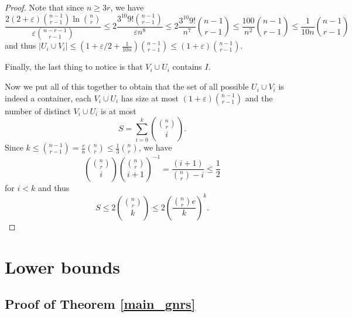 \documentclass[10pt,a4paper]{article}
\theoremstyle{remark}
\theoremstyle{definition}
\newcommand{\skob}[1]{\left(#1\right)}
\begin{document}
\begin{proof}
	Note that since $n \geq 3r$, we have 
	$$
		\frac{2(2+\varepsilon)\binom{n-1}{r-1}\ln \binom{n}{r}}{\varepsilon\binom{n-r-1}{r-1}} \leq  2\frac{3^{10} 9!\binom{n-1}{r-1}}{\varepsilon n^8} \leq 2\frac{3^{10}9!}{n^7}\binom{n-1}{r-1} \leq \frac{100}{n^2}\binom{n-1}{r-1} \leq \frac{1}{10n}\binom{n-1}{r-1}
	$$
	and thus $|U_i \cup V_i| \leq \skob{1 + \varepsilon/2 + \frac{1}{10n}}\binom{n-1}{r-1} \leq (1+\varepsilon)\binom{n-1}{r-1}$.
	
	Finally, the last thing to notice is that $V_i \cup U_i$ contains $I$.

	Now we put all of this together to obtain that the set of all possible $U_i \cup V_i$ is indeed a container, each $V_i \cup U_i$ has size at most $(1+\varepsilon)\binom{n-1}{r-1}$ and the number of distinct $V_i \cup U_i$ is at most
	$$
		S = \sum_{i = 0}^{k}\binom{\binom{n}{r}}{i}.
	$$
	Since $k \leq \binom{n-1}{r-1} = \frac{r}{n}\binom{n}{r} \leq \frac{1}{3}\binom{n}{r}$, we have 
	$$
		\binom{\binom{n}{r}}{i} \binom{\binom{n}{r}}{i+1}^{-1} = \frac{(i+1)}{\binom{n}{r}-i} \leq \frac{1}{2}
	$$
	for $i < k$ and thus
	$$
		S \leq 2\binom{\binom{n}{r}}{k} \leq 2\skob{\frac{\binom{n}{r}e}{k}}^{k}.
	$$ 
\end{proof}


\section{Lower bounds}

\subsection{Proof of Theorem \ref{main_gnrs}}
\end{document}
